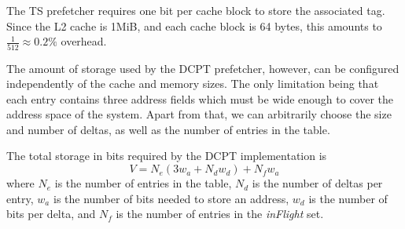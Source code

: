The TS prefetcher requires one bit per cache block to store the associated tag.
Since the L2 cache is 1MiB, and each cache block is 64 bytes, this amounts to
$\frac{1}{512} \approx 0.2\%$ overhead.

The amount of storage used by the DCPT prefetcher, however, can be configured
independently of the cache and memory sizes. The only limitation being that each
entry contains three address fields which must be wide enough to cover the
address space of the system. Apart from that, we can arbitrarily choose the size
and number of deltas, as well as the number of entries in the table.

The total storage in bits required by the DCPT implementation is
\begin{equation*}
V = N_e (3 w_a + N_d w_d) + N_f w_a
\end{equation*}
where $N_e$ is the number of entries in the table, $N_d$ is the number of deltas
per entry, $w_a$ is the number of bits needed to store an address, $w_d$ is the
number of bits per delta, and $N_f$ is the number of entries in the
\emph{inFlight} set.

